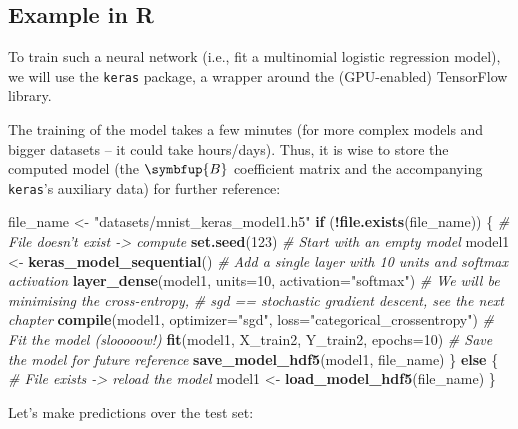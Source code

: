 \documentclass[10pt,b5paper,krantz1]{krantz}
\newenvironment{Shaded}{\begin{snugshade}}{\end{snugshade}}
\newcommand{\CommentTok}[1]{\textcolor[rgb]{0.37,0.37,0.37}{\textit{#1}}}
\newcommand{\ControlFlowTok}[1]{\textcolor[rgb]{0.27,0.27,0.27}{\textbf{#1}}}
\newcommand{\DataTypeTok}[1]{\textcolor[rgb]{0.27,0.27,0.27}{#1}}
\newcommand{\DecValTok}[1]{\textcolor[rgb]{0.06,0.06,0.06}{#1}}
\newcommand{\KeywordTok}[1]{\textcolor[rgb]{0.27,0.27,0.27}{\textbf{#1}}}
\newcommand{\NormalTok}[1]{#1}
\newcommand{\OperatorTok}[1]{\textcolor[rgb]{0.43,0.43,0.43}{\textbf{#1}}}
\newcommand{\StringTok}[1]{\textcolor[rgb]{0.5,0.5,0.5}{#1}}
\renewcommand{\mathbf}[1]{\symbfup{#1}}
\begin{document}
\hypertarget{example-in-r-3}{%
\subsection{Example in R}\label{example-in-r-3}}

To train such a neural network (i.e., fit a multinomial
logistic regression model),
we will use the \texttt{keras} package,
a wrapper around the (GPU-enabled) TensorFlow library.

The training of the model takes a few minutes (for more complex
models and bigger datasets -- it could take hours/days).
Thus, it is wise to store the computed model (the \(\mathbf{B}\)
coefficient matrix and the accompanying \texttt{keras}'s auxiliary data)
for further reference:

\begin{Shaded}
\begin{Highlighting}[]
\NormalTok{file_name <-}\StringTok{ "datasets/mnist_keras_model1.h5"}
\ControlFlowTok{if}\NormalTok{ (}\OperatorTok{!}\KeywordTok{file.exists}\NormalTok{(file_name)) \{ }\CommentTok{# File doesn't exist -> compute}
    \KeywordTok{set.seed}\NormalTok{(}\DecValTok{123}\NormalTok{)}
    \CommentTok{# Start with an empty model}
\NormalTok{    model1 <-}\StringTok{ }\KeywordTok{keras_model_sequential}\NormalTok{()}
    \CommentTok{# Add a single layer with 10 units and softmax activation}
    \KeywordTok{layer_dense}\NormalTok{(model1, }\DataTypeTok{units=}\DecValTok{10}\NormalTok{, }\DataTypeTok{activation=}\StringTok{"softmax"}\NormalTok{)}
    \CommentTok{# We will be minimising the cross-entropy,}
    \CommentTok{# sgd == stochastic gradient descent, see the next chapter}
    \KeywordTok{compile}\NormalTok{(model1, }\DataTypeTok{optimizer=}\StringTok{"sgd"}\NormalTok{,}
            \DataTypeTok{loss=}\StringTok{"categorical_crossentropy"}\NormalTok{)}
    \CommentTok{# Fit the model (slooooow!)}
    \KeywordTok{fit}\NormalTok{(model1, X_train2, Y_train2, }\DataTypeTok{epochs=}\DecValTok{10}\NormalTok{)}
    \CommentTok{# Save the model for future reference}
    \KeywordTok{save_model_hdf5}\NormalTok{(model1, file_name)}
\NormalTok{\} }\ControlFlowTok{else}\NormalTok{ \{ }\CommentTok{# File exists -> reload the model}
\NormalTok{    model1 <-}\StringTok{ }\KeywordTok{load_model_hdf5}\NormalTok{(file_name)}
\NormalTok{\}}
\end{Highlighting}
\end{Shaded}

Let's make predictions over the test set:
\end{document}
